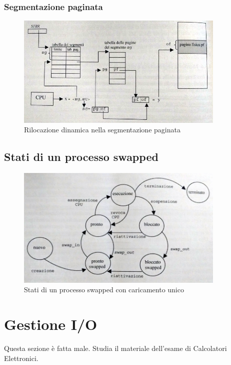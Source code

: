 \documentclass[12pt,a4paper]{article}
\begin{document}
\subsubsection{Segmentazione paginata}
\begin{figure}[H]
\centering
\includegraphics[width=10cm]{img/mem/trad-segmentazione-paginata.png}
\caption{Rilocazione dinamica nella segmentazione paginata}
\end{figure}

\subsection{Stati di un processo swapped}
\begin{figure}[H]
\centering
\includegraphics[width=10cm]{img/mem/stati-processo-swapped.png}
\caption{Stati di un processo swapped con caricamento unico}
\end{figure}

\section{Gestione I/O}

Questa sezione è fatta male. Studia il materiale dell'esame di Calcolatori Elettronici.
\end{document}
